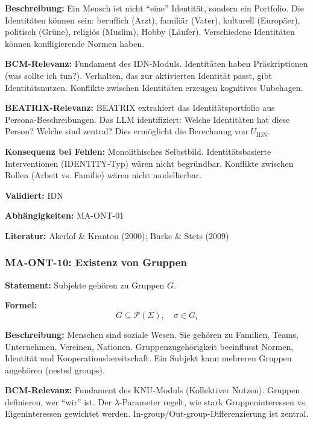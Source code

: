 \textbf{Beschreibung:}
Ein Mensch ist nicht ``eine'' Identität, sondern ein Portfolio. Die Identitäten können sein: beruflich (Arzt), familiär (Vater), kulturell (Europäer), politisch (Grüne), religiös (Muslim), Hobby (Läufer). Verschiedene Identitäten können konfligierende Normen haben.

\textbf{BCM-Relevanz:}
Fundament des IDN-Moduls. Identitäten haben Präskriptionen (was sollte ich tun?). Verhalten, das zur aktivierten Identität passt, gibt Identitätsnutzen. Konflikte zwischen Identitäten erzeugen kognitives Unbehagen.

\textbf{BEATRIX-Relevanz:}
BEATRIX extrahiert das Identitätsportfolio aus Persona-Beschreibungen. Das LLM identifiziert: Welche Identitäten hat diese Person? Welche sind zentral? Dies ermöglicht die Berechnung von $U_{\text{IDN}}$.

\textbf{Konsequenz bei Fehlen:}
Monolithisches Selbstbild. Identitätsbasierte Interventionen (IDENTITY-Typ) wären nicht begründbar. Konflikte zwischen Rollen (Arbeit vs. Familie) wären nicht modellierbar.

\textbf{Validiert:} IDN

\textbf{Abhängigkeiten:} MA-ONT-01

\textbf{Literatur:} Akerlof \& Kranton (2000); Burke \& Stets (2009)


\subsubsection*{MA-ONT-10: Existenz von Gruppen}

\textbf{Statement:} Subjekte gehören zu Gruppen $G$.

\textbf{Formel:}
\begin{equation}
G \subseteq \mathcal{P}(\Sigma), \quad \sigma \in G_i
\end{equation}

\textbf{Beschreibung:}
Menschen sind soziale Wesen. Sie gehören zu Familien, Teams, Unternehmen, Vereinen, Nationen. Gruppenzugehörigkeit beeinflusst Normen, Identität und Kooperationsbereitschaft. Ein Subjekt kann mehreren Gruppen angehören (nested groups).

\textbf{BCM-Relevanz:}
Fundament des KNU-Moduls (Kollektiver Nutzen). Gruppen definieren, wer ``wir'' ist. Der $\lambda$-Parameter regelt, wie stark Gruppeninteressen vs. Eigeninteressen gewichtet werden. In-group/Out-group-Differenzierung ist zentral.

